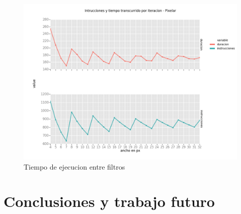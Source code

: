 \documentclass[a4paper]{article}
\begin{document}
\begin{figure}[!htb]
  \begin{center}
	\includegraphics[scale=0.6]{imagenes/diagramas/graficos/LowWidthCacheMissesEInstruccionesPixelar.png}
	\caption{Tiempo de ejecucion entre filtros}
	\label{LowWidthCacheMissesEInstruccionesPixelar}
  \end{center}
\end{figure}

\section{Conclusiones y trabajo futuro}
\end{document}
